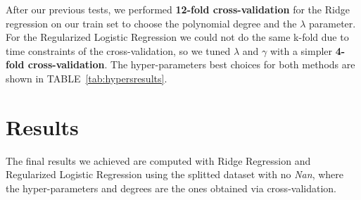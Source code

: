 \documentclass[10pt,article]{IEEEtran}
\begin{document}
After our previous tests, we performed \textbf{12-fold cross-validation} for the Ridge regression on our train set to choose the polynomial degree and the $\lambda$ parameter. For the Regularized Logistic Regression we could not do the same k-fold due to time constraints of the cross-validation, so we tuned $\lambda$ and $\gamma$ with a simpler \textbf{4-fold cross-validation}. The hyper-parameters best choices for both methods are shown in TABLE~\ref{tab:hypersresults}.

\begin{table}[hbt]
\centering
{}
\caption{Hyper-parameters selection results}
\label{tab:hypersresults}
\vspace{-0.5cm}
\end{table}
\FloatBarrier


\section{Results}
\label{sec:results}
The final results we achieved are computed with Ridge Regression and Regularized Logistic Regression using the splitted dataset with no \textit{Nan}, where the hyper-parameters and degrees are the ones obtained via cross-validation. 
\end{document}
